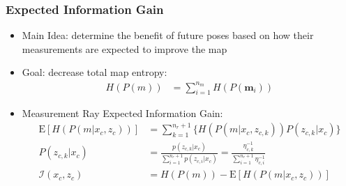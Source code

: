 \documentclass[11pt,professionalfonts,hyperref={pdftex,pdfpagemode=none,pdfstartview=FitH}]{beamer}
\begin{document}
\begin{frame}
\frametitle{Expected Information Gain}

\begin{itemize}
	\item Main Idea: determine the benefit of future poses based on how their measurements are expected to improve the map
	\vspace*{0.0cm}\pause
	\item Goal: decrease total map entropy:
	\begin{align*}
		H(P(m))&=\sum_{i=1}^{n_m}H(P(\mathbf{m}_i))
	\end{align*}
	\vspace*{0.0cm}\pause
	\item Measurement Ray Expected Information Gain:
	\begin{align*}
		\text{E}[H(P(m|x_c,z_{c}))]&=\sum_{k=1}^{n_{r}+1}\bigg\{H(P(m|x_c,z_{c,k}))P(z_{c,k}|x_c)\bigg\}
		\\
		P(z_{c,k}|x_c)&=\frac{p(z_{c,k}|x_c)}{\sum_{i=1}^{n_{r}+1}p(z_{c,i}|x_c)}=\frac{\eta_{c,k}^{-1}}{\sum_{i=1}^{n_{r}+1}\eta_{c,i}^{-1}}
		\\
		\mathcal I(x_c,z_{c})&=H(P(m))-\text{E}[H(P(m|x_c,z_{c}))]
	\end{align*}
\end{itemize}

\end{frame}
\end{document}
